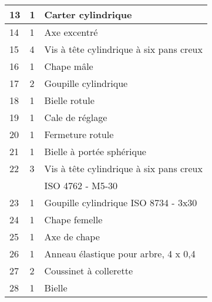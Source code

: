 \begin{multicols}{2}
\begin{center}
\begin{tabular}{|l|l|l|}
13&
1&
Carter cylindrique\\ \hline %
14&
1&
Axe excentré \\ \hline %
15&
4&
Vis à tête cylindrique à six pans creux\\ \hline %
16&
1&
Chape mâle\\ \hline %
17&
2&
Goupille cylindrique \\ \hline %
18&
1&
Bielle rotule \\ \hline %
19&
1&
Cale de réglage \\ \hline %
20&
1&
Fermeture rotule \\ \hline %
21&
1&
Bielle à portée sphérique \\ \hline %
22&
3&
Vis à tête cylindrique à six pans creux  \\
&& ISO 4762 - M5-30 \\ \hline %
23&
1&
Goupille cylindrique ISO 8734 - 3x30  \\ \hline %
24&
1&
Chape femelle \\ \hline %

25&
1&
Axe de chape \\ \hline %
26&
1&
Anneau élastique pour arbre, 4 x 0,4 \\ \hline %
27&
2&
Coussinet à collerette \\ \hline %
28&
1&
Bielle \\ \hline %
\end{tabular}
\end{center}


\end{multicols}
